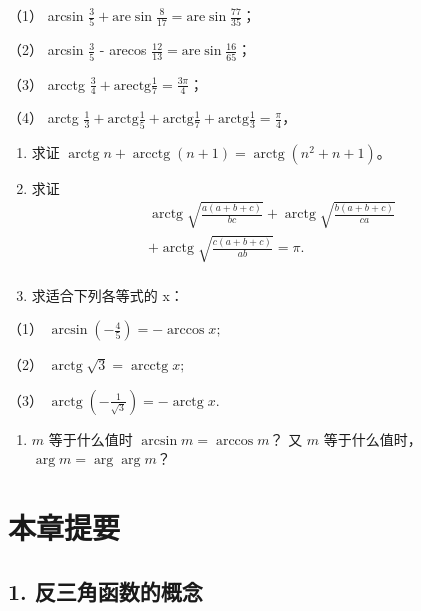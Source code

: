 （1） arcsin
\(\frac{3}{5} + \text{are}\sin \frac{8}{17} = \text{are}\sin \frac{77}{35}\)；

（2） arcsin \(\frac{3}{5}\) - arecos
\(\frac{12}{13} = \text{are}\sin \frac{16}{65}\)；

（3） arcctg
\(\frac{3}{4} + \text{arectg} \frac{1}{7} = \frac{3\pi}{4}\)；

（4） arctg
\(\frac{1}{3} + \text{arctg} \frac{1}{5} + \text{arctg} \frac{1}{7} + \text{arctg} \frac{1}{3} = \frac{\pi}{4}\)，

\begin{enumerate}[start=3]
\item
  求证
  \(\operatorname{arctg}n+\operatorname{arcctg}(n+1)=\operatorname{arctg}(n^2+n+1)\)。
\item
  求证
\[
\begin{array}{l} \operatorname{arctg} \sqrt {\frac {a (a + b + c)}{b c}} + \operatorname{arctg} \sqrt {\frac {b (a + b + c)}{c a}} \\ + \operatorname{arctg} \sqrt {\frac {c (a + b + c)}{a b}} = \pi . \\ \end{array}
\]
\item
  求适合下列各等式的 x：
\end{enumerate}

（1） \(\arcsin\left(-\frac{4}{5}\right)=-\arccos x;\)

（2） \(\operatorname{arctg}\sqrt{3} = \operatorname{arcctg}x;\)

（3）
\(\operatorname{arctg}\left(-\frac{1}{\sqrt{3}}\right) = -\operatorname{arctg}x.\)

\begin{enumerate}[start=6]
\item
  \(m\) 等于什么值时 \(\arcsin m = \arccos m\)？ 又 \(m\) 等于什么值时，
  \(\arg m = \arg \arg m\)？
\end{enumerate}

\section{本章提要}

\subsection{1. 反三角函数的概念}

